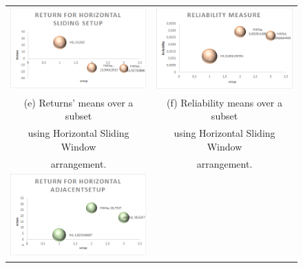 \documentclass{beamer}
\begin{document}
\begin{frame}
\begin{figure}
    \centering
		\begin{tabular}{c c}
        \includegraphics[scale=0.5]{TrendHSReturn.png} &
        \includegraphics[scale=0.5]{TrendHSReliability.png} \\
    \scriptsize (e) Returns' means over a subset & \scriptsize (f) Reliability means over a subset \\
    \scriptsize using Horizontal Sliding Window & \scriptsize using Horizontal Sliding Window\\
		\scriptsize arrangement. & \scriptsize arrangement.\\
        \includegraphics[scale=0.5]{TrendHAReturn.png} &

\end{tabular}
\end{figure}
\end{frame}
\end{document}
